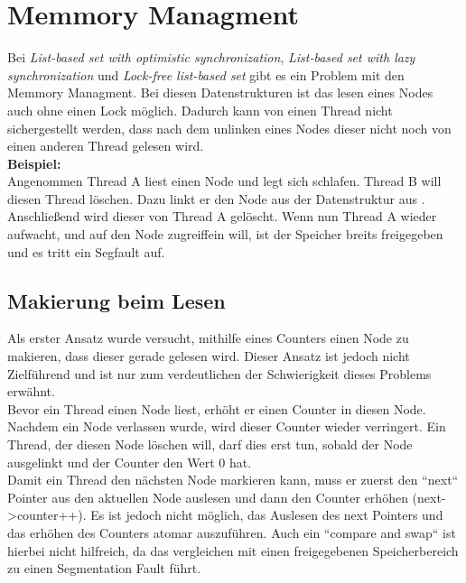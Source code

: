 \section{Memmory Managment}\label{sec:mem}
Bei \textit{List-based set with optimistic synchronization}, \textit{List-based set with lazy synchronization} und \textit{Lock-free list-based set}
gibt es ein Problem mit den Memmory Managment. Bei diesen Datenstrukturen ist das lesen eines Nodes auch ohne einen Lock möglich. 
Dadurch kann von einen Thread nicht sichergestellt werden, dass nach dem unlinken eines Nodes dieser nicht noch von einen anderen Thread gelesen wird.
\\ 
\textbf{Beispiel:}
\\ Angenommen Thread A liest einen Node und legt sich schlafen. Thread B will diesen Thread löschen. Dazu linkt er den Node aus der Datenstruktur aus
. Anschließend wird dieser von Thread A gelöscht. Wenn nun Thread A wieder aufwacht, und auf den Node zugreiffein will, ist der Speicher breits freigegeben
und es tritt ein Segfault auf. 

\subsection{Makierung beim Lesen}
Als erster Ansatz wurde versucht, mithilfe eines Counters einen Node zu makieren, dass dieser gerade gelesen wird. Dieser Ansatz ist jedoch nicht 
Zielführend und ist nur zum verdeutlichen der Schwierigkeit dieses Problems erwähnt. \\
Bevor ein Thread einen Node liest, erhöht er einen Counter in diesen Node. Nachdem ein Node verlassen wurde, wird dieser Counter wieder verringert.
Ein Thread, der diesen Node löschen will, darf dies erst tun, sobald der Node ausgelinkt und der Counter den Wert 0 hat. \\
Damit ein Thread den nächsten Node markieren kann, muss er zuerst den “next“ Pointer aus den aktuellen Node auslesen und dann den Counter erhöhen (next->counter++).
Es ist jedoch nicht möglich, das Auslesen des next Pointers und das erhöhen des Counters atomar auszuführen. Auch ein “compare and swap“ ist hierbei nicht hilfreich,
da das vergleichen mit einen freigegebenen Speicherbereich zu einen Segmentation Fault führt. 


